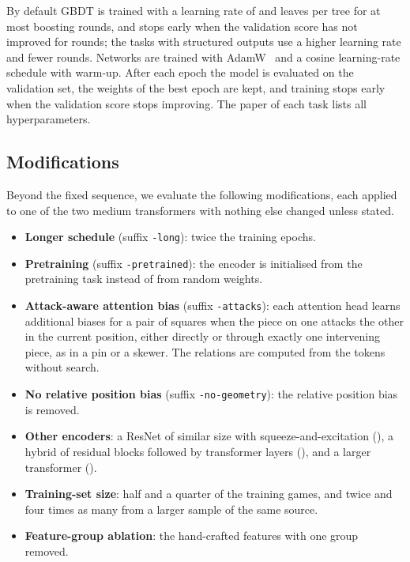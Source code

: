 \documentclass[11pt]{article}
\begin{document}
By default GBDT is trained with a learning rate of  and
 leaves per tree for at most 
boosting rounds, and stops early when the validation score has not improved
for  rounds; the tasks with structured outputs use a
higher learning rate and fewer rounds. Networks are trained with
AdamW~\cite{adamw} and a cosine learning-rate schedule with warm-up. After
each epoch the model is evaluated on the validation set, the weights of the
best epoch are kept, and training stops early when the validation score stops
improving. The paper of each task lists all hyperparameters.

\subsection{Modifications}
\label{sec:modifications}

Beyond the fixed sequence, we evaluate the following modifications, each
applied to one of the two medium transformers with nothing else changed
unless stated.
\begin{itemize}
\item \textbf{Longer schedule} (suffix \texttt{-long}): twice the training
epochs.
\item \textbf{Pretraining} (suffix \texttt{-pretrained}): the encoder is
initialised from the pretraining task instead of from random weights.
\item \textbf{Attack-aware attention bias} (suffix \texttt{-attacks}): each
attention head learns additional biases for a pair of squares when the piece
on one attacks the other in the current position, either directly or through
exactly one intervening piece, as in a pin or a skewer. The relations are
computed from the tokens without search.
\item \textbf{No relative position bias} (suffix \texttt{-no-geometry}): the
relative position bias is removed.
\item \textbf{Other encoders}: a ResNet of similar size with
squeeze-and-excitation (), a hybrid of residual blocks
followed by transformer layers (), and a larger
transformer ().
\item \textbf{Training-set size}: half and a quarter of the training games,
and twice and four times as many from a larger sample of the same source.
\item \textbf{Feature-group ablation}: the hand-crafted features with one
group removed.
\end{itemize}
\end{document}
